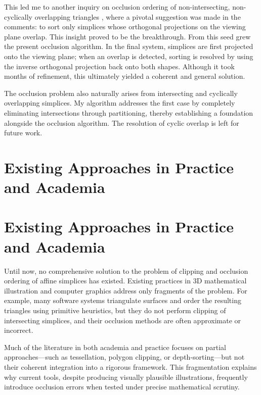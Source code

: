 This led me to another inquiry on occlusion ordering of
non-intersecting, non-cyclically overlapping triangles
\cite{5063772}, where a pivotal suggestion was made in the
comments: to sort only simplices whose orthogonal projections on
the viewing plane overlap. This insight proved to be the
breakthrough. From this seed grew the present occlusion algorithm.
In the final system, simplices are first projected onto the viewing
plane; when an overlap is detected, sorting is resolved by using
the inverse orthogonal projection back onto both shapes. Although
it took months of refinement, this ultimately yielded a coherent
and general solution.

The occlusion problem also naturally arises from intersecting and
cyclically overlapping simplices. My algorithm addresses the first
case by completely eliminating intersections through partitioning,
thereby establishing a foundation alongside the occlusion
algorithm. The resolution of cyclic overlap is left for future
work.

\section{Existing Approaches in Practice and Academia}

\section{Existing Approaches in Practice and Academia}

Until now, no comprehensive solution to the problem of clipping 
and occlusion ordering of affine simplices has existed. Existing 
practices in \(3\)D mathematical illustration and computer graphics 
address only fragments of the problem. For example, many software 
systems triangulate surfaces and order the resulting triangles 
using primitive heuristics, but they do not perform clipping of 
intersecting simplices, and their occlusion methods are often 
approximate or incorrect. 

Much of the literature in both academia and practice focuses on 
partial approaches---such as tessellation, polygon clipping, or 
depth-sorting---but not their coherent integration into a rigorous 
framework. This fragmentation explains why current tools, despite 
producing visually plausible illustrations, frequently introduce 
occlusion errors when tested under precise mathematical scrutiny. 

